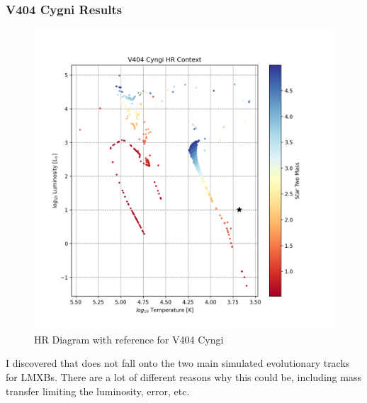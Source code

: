 \documentclass[12pt, letterpaper]{article}
\begin{document}
        \subsubsection{V404 Cygni Results}
            \begin{figure}[H] 
                \centering
                \includegraphics[scale = .6]{figs/Generated Figs/ V404 Cyngi HR Context Star Two Mass log10 F star radius 5.png}
                \caption{HR Diagram with reference for V404 Cyngi}
                \label{V404Context}
            \end{figure}

            I discovered that does not fall onto the two main simulated evolutionary tracks for LMXBs. There are a lot of different reasons why this could be, including mass transfer limiting the luminosity, error, etc. 
            

\end{document}
